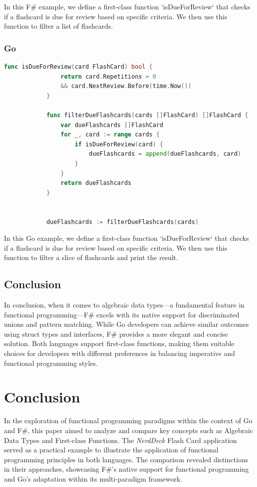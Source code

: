         In this F\# example, we define a first-class function `isDueForReview` that checks if a flashcard is due for review based on specific criteria. We then use this function to filter a list of flashcards.
        
    \subsection*{Go}    
        \begin{lstlisting}[language=go, firstnumber=1, caption={FlashCard representation in F\#}, label=l:flashcardfsharp]
            func isDueForReview(card FlashCard) bool {
                return card.Repetitions > 0 
                && card.NextReview.Before(time.Now())
            }
            
            func filterDueFlashcards(cards []FlashCard) []FlashCard {
                var dueFlashcards []FlashCard
                for _, card := range cards {
                    if isDueForReview(card) {
                        dueFlashcards = append(dueFlashcards, card)
                    }
                }
                return dueFlashcards
            }
            
    
            dueFlashcards := filterDueFlashcards(cards)
            \end{lstlisting}
            
            In this Go example, we define a first-class function `isDueForReview` that checks if a flashcard is due for review based on specific criteria. We then use this function to filter a slice of flashcards and print the result.

    \section{Conclusion}
    In conclusion, when it comes to algebraic data types—a fundamental feature in functional programming—F\# excels with its native support for discriminated unions and pattern matching. While Go developers can achieve similar outcomes using struct types and interfaces, F\# provides a more elegant and concise solution. Both languages support first-class functions, making them suitable choices for developers with different preferences in balancing imperative and functional programming styles.


\chapter{Conclusion}\label{chap:conclusion}
In the exploration of functional programming paradigms within the context of Go and F\#, this paper aimed to analyze and compare key concepts such as Algebraic Data Types and First-class Functions. The \textit{NerdDeck} Flash Card application served as a practical example to illustrate the application of functional programming principles in both languages. The comparison revealed distinctions in their approaches, showcasing F\#'s native support for functional programming and Go's adaptation within its multi-paradigm framework.
